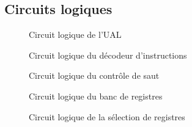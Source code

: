 \documentclass[10pt,a4paper]{article}
\begin{document}
\subsection{Circuits logiques}

\begin{figure}[h]
\centering
\caption{Circuit logique de l'UAL}
\label{circuit_ual}
\end{figure}

\begin{figure}[h]
\centering
\caption{Circuit logique du décodeur d'instructions}
\label{circuit_decodeur}
\end{figure}

\begin{figure}[h]
\centering
\caption{Circuit logique du contrôle de saut}
\label{circuit_controle}
\end{figure}

\begin{figure}[h]
\centering
\caption{Circuit logique du banc de registres}
\label{circuit_banc}
\end{figure}

\begin{figure}[h]
\centering
\caption{Circuit logique de la sélection de registres}
\label{circuit_selection}
\end{figure}
\end{document}
